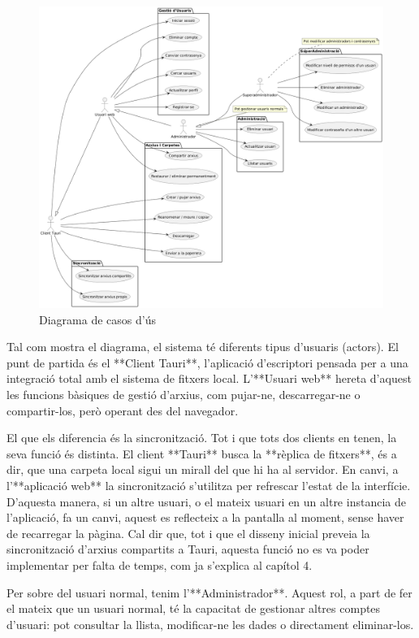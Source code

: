 \begin{figure}[H]
\centering
\includegraphics[width=\textwidth]{Figures/use_case_diagram.png}
\caption{Diagrama de casos d'ús}
\end{figure}

Tal com mostra el diagrama, el sistema té diferents tipus d'usuaris (actors). El punt de partida és el **Client Tauri**, l'aplicació d'escriptori pensada per a una integració total amb el sistema de fitxers local. L'**Usuari web** hereta d'aquest les funcions bàsiques de gestió d'arxius, com pujar-ne, descarregar-ne o compartir-los, però operant des del navegador. 

El que els diferencia és la sincronització. Tot i que tots dos clients en tenen, la seva funció és distinta. El client **Tauri** busca la **rèplica de fitxers**, és a dir, que una carpeta local sigui un mirall del que hi ha al servidor. En canvi, a l'**aplicació web** la sincronització s'utilitza per refrescar l'estat de la interfície. D'aquesta manera, si un altre usuari, o el mateix usuari en un altre instancia de l'aplicació, fa un canvi, aquest es reflecteix a la pantalla al moment, sense haver de recarregar la pàgina. Cal dir que, tot i que el disseny inicial preveia la sincronització d'arxius compartits a Tauri, aquesta funció no es va poder implementar per falta de temps, com ja s'explica al capítol 4.

Per sobre del usuari normal, tenim l'**Administrador**. Aquest rol, a part de fer el mateix que un usuari normal, té la capacitat de gestionar altres comptes d'usuari: pot consultar la llista, modificar-ne les dades o directament eliminar-los.

